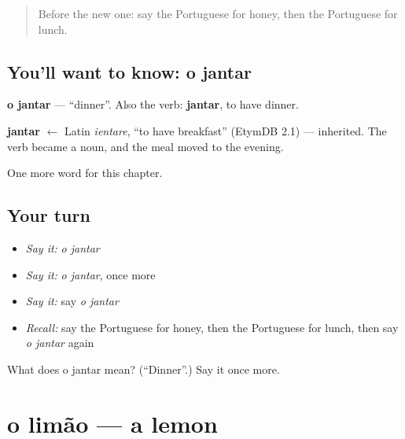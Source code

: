 \label{lesson:PT-C47-jantar}



\begin{quote}
Before the new one: say the Portuguese for honey, then the Portuguese for lunch.
\end{quote}

\subsection*{You'll want to know: o jantar}
\textbf{o jantar} — \textquotedblleft{}dinner\textquotedblright{}. Also the verb: \textbf{jantar}, to have dinner.

\begin{cousinweb}
\textbf{jantar} $\leftarrow$ Latin \emph{ientare}, \textquotedblleft{}to have breakfast\textquotedblright{} (EtymDB 2.1) — inherited. The verb became a noun, and the meal moved to the evening.
\end{cousinweb}

\begin{grammarlens}[title={What you've built}]
One more word for this chapter.
\end{grammarlens}

\subsection*{Your turn}
\begin{itemize}
\raggedright
  \item \emph{Say it:} \emph{o jantar}
  \item \emph{Say it:} \emph{o jantar}, once more
  \item \emph{Say it:} say \emph{o jantar}
  \item \emph{Recall:} say the Portuguese for honey, then the Portuguese for lunch, then say \emph{o jantar} again
\end{itemize}

\begin{tcolorbox}[breakable,colback=teal!4,colframe=teal!35!black,title={Before you move on}]
What does o jantar mean? (\textquotedblleft{}Dinner\textquotedblright{}.) Say it once more.
\end{tcolorbox}
\section[o limão]{o limão — a lemon}

\label{lesson:PT-C47-limao}



